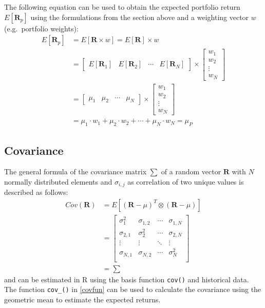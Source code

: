 \documentclass[
  oneside]{book}
\begin{document}
The following equation can be used to obtain the expected portfolio return \(E[\pmb{R}_p]\) using the formulations from the section above and a weighting vector \(w\) (e.g.~portfolio weights):
\begin{align*}
E[\pmb{R}_p] &=
 E[\pmb{R} \times w] = 
 E[\pmb{R}] \times w \\
 &= 
  \begin{bmatrix}
    E[\pmb{R}_{1}] & E[\pmb{R}_{2}] & \cdots & E[\pmb{R}_{N}]
 \end{bmatrix}
  \times 
  \begin{bmatrix}
    w_{1} \\ 
    w_{2} \\
    \vdots \\
    w_{N}  
 \end{bmatrix} \\
 &=
   \begin{bmatrix}
    \mu_{1} & \mu_{2} & \cdots & \mu_{N}
 \end{bmatrix}
  \times 
  \begin{bmatrix}
    w_{1} \\ 
    w_{2} \\
    \vdots \\
    w_{N}  
 \end{bmatrix} \\
 &=
 \mu_{1} \cdot w_1 + \mu_{2} \cdot w_2 + \cdots + \mu_{N} \cdot w_{N} 
 =
 \mu_P
\end{align*}

\hypertarget{covariance}{%
\subsection{Covariance}\label{covariance}}

The general formula of the covariance matrix \(\textstyle\sum\) of a random vector \(\pmb{R}\) with \(N\) normally distributed elements and \(\sigma_{i,j}\) as correlation of two unique values is described as follows:
\begin{align*}
  Cov(\pmb{R}) &= E[(\pmb{R}-\mu)^T \otimes (\pmb{R}-\mu)] \\
  &=   \begin{bmatrix}
    \sigma_1^2 & \sigma_{1,2} & \cdots & \sigma_{1,N} \\
    \sigma_{2, 1} & \sigma_2^2 & \cdots & \sigma_{2, N} \\
    \vdots  & \vdots & \ddots & \vdots \\
    \sigma_{N, 1} & \sigma_{N, 2} & \cdots & \sigma_N^2 \\
 \end{bmatrix}\\
  &=\textstyle\sum
\end{align*}
and can be estimated in R using the basis function \texttt{cov()} and historical data. The function \texttt{cov\_()} in \ref{covfun} can be used to calculate the covariance using the geometric mean to estimate the expected returns.
\end{document}
